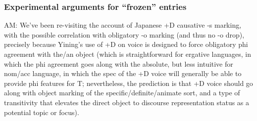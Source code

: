 		\subsubsection{Experimental arguments for ``frozen'' entries \citep{fadlon12}}  


AM: We've been re-visiting the account of Japanese +D causative -s marking, with the possible correlation with obligatory -o marking (and thus no -o drop), precisely because Yining's use of +D on voice is designed to force obligatory phi agreement with the/an object (which is straightforward for ergative languages, in which the phi agreement goes along with the absolute, but less intuitive for nom/acc language, in which the spec of the +D voice will generally be able to provide phi features for T; nevertheless, the prediction is that +D voice should go along with object marking of the specific/definite/animate sort, and a type of transitivity that elevates the direct object to discourse representation status as a potential topic or focus).